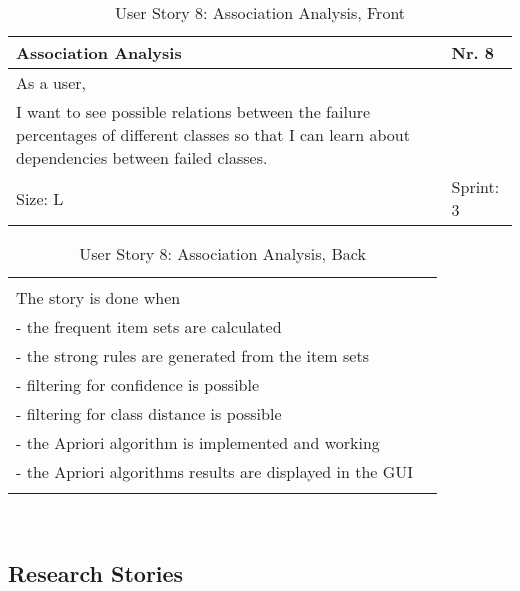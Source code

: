 \begin{table}[H]
  \caption{User Story 8: Association Analysis, Front}
  \label{Story_8_Front}
  \centering
  \begin{tabular}{|p{9cm} p{2cm}|}
	\hline  	
  	Association Analysis & Nr. 8 \\ 
  	\hline
  	As a user, &    \\ 
  	I want to see possible relations between the failure percentages of different classes so that I can learn about dependencies between failed classes. &    \\ 
  	Size: L & Sprint: 3 \\ 
  	\hline
  \end{tabular}
\end{table}
\begin{table}[H]
  \caption{User Story 8: Association Analysis, Back}
  \label{Story_8_Back}
  \centering
  \begin{tabular}{|p{10cm} p{1cm}|}
  \hline
  	  &    \\ 
  	The story is done when &    \\ 
  	 - the frequent item sets are calculated & \\ 
  	 - the strong rules are generated from the item sets & \\ 
  	 - filtering for confidence is possible & \\ 
  	 - filtering for class distance is possible & \\ 
  	 - the Apriori algorithm is implemented and working & \\ 
  	 - the Apriori algorithms results are displayed in the GUI & \\ 
  	 
  	  &  
  	   \\ 
  	\hline
  \end{tabular}
\end{table} 

\ \\ 

\subsection*{Research Stories} 

